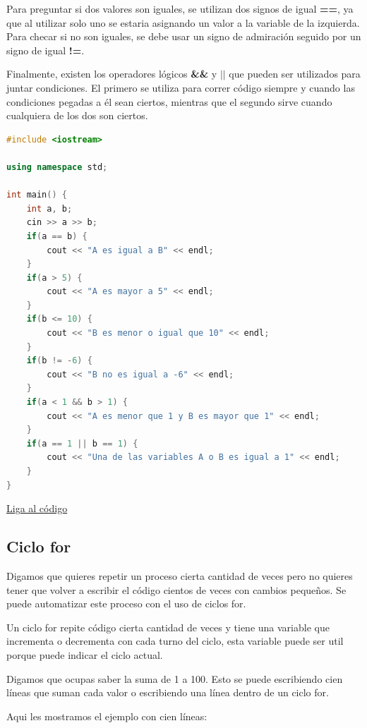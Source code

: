 \documentclass{article}
\begin{document}
Para preguntar si dos valores son iguales, se utilizan dos signos de igual \textbf{==}, ya que al utilizar solo uno se estaria asignando un valor a la variable de la izquierda. Para checar si no son iguales, se debe usar un signo de admiración seguido por un signo de igual \textbf{!=}.

Finalmente, existen los operadores lógicos \textbf{\&\&} y \textbf{$||$} que pueden ser utilizados para juntar condiciones. El primero se utiliza para correr código siempre y cuando las condiciones pegadas a él sean ciertos, mientras que el segundo sirve cuando cualquiera de los dos son ciertos.

\begin{lstlisting}[language=C++, caption=Condiciones]
#include <iostream>

using namespace std;

int main() {
    int a, b;
    cin >> a >> b;
    if(a == b) {
        cout << "A es igual a B" << endl;
    }
    if(a > 5) {
        cout << "A es mayor a 5" << endl;
    }
    if(b <= 10) {
        cout << "B es menor o igual que 10" << endl;
    }
    if(b != -6) {
        cout << "B no es igual a -6" << endl;
    }
    if(a < 1 && b > 1) {
        cout << "A es menor que 1 y B es mayor que 1" << endl;
    }
    if(a == 1 || b == 1) {
        cout << "Una de las variables A o B es igual a 1" << endl;
    }
}
\end{lstlisting}
\href{https://repl.it/@Jamesscn/Condiciones}{Liga al código}\\

\subsection{Ciclo for}

Digamos que quieres repetir un proceso cierta cantidad de veces pero no quieres tener que volver a escribir el código cientos de veces con cambios pequeños. Se puede automatizar este proceso con el uso de ciclos for.

Un ciclo for repite código cierta cantidad de veces y tiene una variable que incrementa o decrementa con cada turno del ciclo, esta variable puede ser util porque puede indicar el ciclo actual.

Digamos que ocupas saber la suma de 1 a 100. Esto se puede escribiendo cien líneas que suman cada valor o escribiendo una línea dentro de un ciclo for.

Aqui les mostramos el ejemplo con cien líneas:
\end{document}
